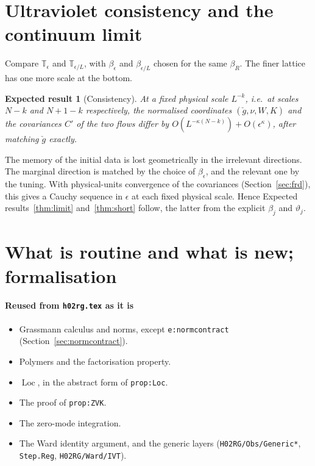 \documentclass[11pt]{amsart}
\newtheorem{conjecture}[theorem]{Expected result}
\theoremstyle{definition}
\theoremstyle{remark}
\numberwithin{equation}{section}
\newcommand{\T}{\mathbb{T}}
\newcommand{\Loc}{\operatorname{Loc}}
\newcommand{\hr}{\texttt{h02rg.tex}}
\begin{document}
\section{Ultraviolet consistency and the continuum limit}
\label{sec:uv}

Compare $\T_\epsilon$ and $\T_{\epsilon/L}$, with $\beta_\epsilon$ and $\beta_{\epsilon/L}$ chosen
for the same $\beta_R$. The finer lattice has one more scale at the bottom.

\begin{conjecture}[Consistency]\label{thm:uv}
At a fixed physical scale $L^{-k}$, i.e.\ at scales $N-k$ and $N+1-k$ respectively, the
normalised coordinates $(\check g,\nu,W,K)$ and the covariances $C'$ of the two flows differ by
$O(L^{-\kappa(N-k)})+O(\epsilon^\kappa)$, after matching $\check g$ exactly.
\end{conjecture}

The memory of the initial data is lost geometrically in the irrelevant directions. The marginal
direction is matched by the choice of $\beta_\epsilon$, and the relevant one by the tuning.
With physical-units convergence of the covariances (Section~\ref{sec:frd}), this gives a Cauchy
sequence in $\epsilon$ at each fixed physical scale. Hence Expected results~\ref{thm:limit}
and~\ref{thm:short} follow, the latter from the explicit $\beta_j$ and $\vartheta_j$.

\section{What is routine and what is new; formalisation}
\label{sec:new}

\paragraph{Reused from \hr{} as it is}
\begin{itemize}
\item Grassmann calculus and norms, except \texttt{e:normcontract} (Section~\ref{sec:normcontract}).
\item Polymers and the factorisation property.
\item $\Loc$, in the abstract form of \texttt{prop:Loc}.
\item The proof of \texttt{prop:ZVK}.
\item The zero-mode integration.
\item The Ward identity argument, and the generic layers (\texttt{H02RG/Obs/Generic*}, \texttt{Step.Reg},
  \texttt{H02RG/Ward/IVT}).
\end{itemize}
\end{document}
